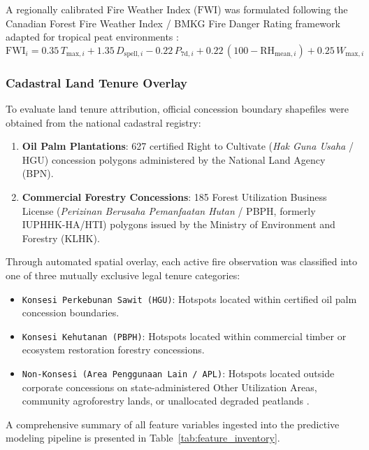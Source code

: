 A regionally calibrated Fire Weather Index ($\text{FWI}$) was formulated following the Canadian Forest Fire Weather Index / BMKG Fire Danger Rating framework adapted for tropical peat environments \citep{Spessa2015Biogeosciences}:
\begin{equation}
\text{FWI}_i = 0.35\,T_{\text{max}, i} + 1.35\,D_{\text{spell}, i} - 0.22\,P_{\text{7d}, i} + 0.22\,(100 - \text{RH}_{\text{mean}, i}) + 0.25\,W_{\text{max}, i}
\label{eq:fwi}
\end{equation}

\subsubsection{Cadastral Land Tenure Overlay}
\label{subsubsec:tenure_overlay}

To evaluate land tenure attribution, official concession boundary shapefiles were obtained from the national cadastral registry:
\begin{enumerate}
    \item \textbf{Oil Palm Plantations}: 627 certified Right to Cultivate (\textit{Hak Guna Usaha} / HGU) concession polygons administered by the National Land Agency (BPN).
    \item \textbf{Commercial Forestry Concessions}: 185 Forest Utilization Business License (\textit{Perizinan Berusaha Pemanfaatan Hutan} / PBPH, formerly IUPHHK-HA/HTI) polygons issued by the Ministry of Environment and Forestry (KLHK).
\end{enumerate}

Through automated spatial overlay, each active fire observation was classified into one of three mutually exclusive legal tenure categories:
\begin{itemize}
    \item \texttt{Konsesi Perkebunan Sawit (HGU)}: Hotspots located within certified oil palm concession boundaries.
    \item \texttt{Konsesi Kehutanan (PBPH)}: Hotspots located within commercial timber or ecosystem restoration forestry concessions.
    \item \texttt{Non-Konsesi (Area Penggunaan Lain / APL)}: Hotspots located outside corporate concessions on state-administered Other Utilization Areas, community agroforestry lands, or unallocated degraded peatlands \citep{Putranto2023LandUsePol}.
\end{itemize}

A comprehensive summary of all feature variables ingested into the predictive modeling pipeline is presented in Table~\ref{tab:feature_inventory}.

